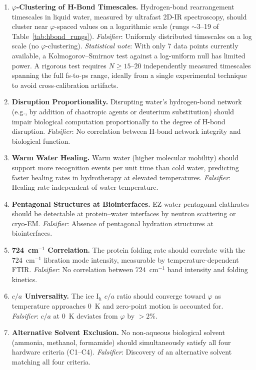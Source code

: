 \documentclass[12pt,a4paper]{article}
\theoremstyle{definition}
\theoremstyle{remark}
\begin{document}
\begin{enumerate}[label=\textbf{P\arabic*}.]

\item \textbf{$\varphi$-Clustering of H-Bond Timescales.}
  Hydrogen-bond rearrangement timescales in liquid water, measured by
  ultrafast 2D-IR spectroscopy, should cluster near $\varphi$-spaced
  values on a logarithmic scale (rungs $\sim 3$--19 of
  Table~\ref{tab:hbond_rungs}).
  \textit{Falsifier}: Uniformly distributed timescales on a log scale
  (no $\varphi$-clustering).
  \textit{Statistical note}: With only 7 data points currently
  available, a Kolmogorov--Smirnov test against a log-uniform null has
  limited power.  A rigorous test requires $N \geq 15$--$20$
  independently measured timescales spanning the full fs-to-ps range,
  ideally from a single experimental technique to avoid
  cross-calibration artifacts.

\item \textbf{Disruption Proportionality.}
  Disrupting water's hydrogen-bond network (e.g., by addition of
  chaotropic agents or deuterium substitution) should impair biological
  computation proportionally to the degree of H-bond disruption.
  \textit{Falsifier}: No correlation between H-bond network integrity
  and biological function.

\item \textbf{Warm Water Healing.}
  Warm water (higher molecular mobility) should support more recognition
  events per unit time than cold water, predicting faster healing
  rates in hydrotherapy at elevated temperatures.
  \textit{Falsifier}: Healing rate independent of water temperature.

\item \textbf{Pentagonal Structures at Biointerfaces.}
  EZ water pentagonal clathrates should be detectable at protein--water
  interfaces by neutron scattering or cryo-EM.
  \textit{Falsifier}: Absence of pentagonal hydration structures at
  biointerfaces.

\item \textbf{724~cm$^{-1}$ Correlation.}
  The protein folding rate should correlate with the
  $724$~cm$^{-1}$ libration mode intensity, measurable by
  temperature-dependent FTIR.
  \textit{Falsifier}: No correlation between $724$~cm$^{-1}$ band
  intensity and folding kinetics.

\item \textbf{$c/a$ Universality.}
  The ice I$_h$ $c/a$ ratio should converge toward $\varphi$ as
  temperature approaches $0$~K and zero-point motion is
  accounted for.
  \textit{Falsifier}: $c/a$ at 0~K deviates from $\varphi$ by $> 2\%$.

\item \textbf{Alternative Solvent Exclusion.}
  No non-aqueous biological solvent (ammonia, methanol, formamide)
  should simultaneously satisfy all four hardware criteria (C1--C4).
  \textit{Falsifier}: Discovery of an alternative solvent matching
  all four criteria.

\end{enumerate}
\end{document}
